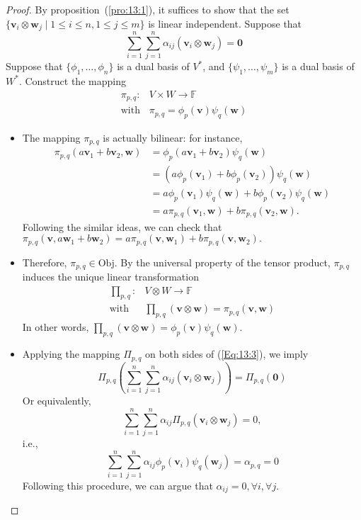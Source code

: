 \begin{proof}
By proposition~(\ref{pro:13:1}), 
it suffices to show that the set $\{\bm v_i\otimes\bm w_j\mid 1\le i\le n, 1\le j\le m\}$ is linear independent.
Suppose that
\begin{equation}\label{Eq:13:3}
\sum_{i=1}^n\sum_{j=1}^n\alpha_{ij}(\bm v_i\otimes\bm w_j)=\bm0
\end{equation}
Suppose that $\{\phi_1,\dots,\phi_n\}$ is a dual basis of $V^*$, and $\{\psi_1,\dots,\psi_m\}$ is a dual basis of $W^*$.
Construct the mapping
\[
\begin{array}{ll}
\pi_{p,q}:&V\times W\to\mathbb{F}\\
\text{with}&\pi_{p,q} = \phi_p(\bm v)\psi_q(\bm w)
\end{array}
\]
\begin{itemize}
\item
The mapping $\pi_{p,q}$ is actually bilinear: for instance,
\begin{align*}
\pi_{p,q}(a\bm v_1+b\bm v_2,\bm w)
&=
\phi_p(a\bm v_1+b\bm v_2)\psi_q(\bm w)\\
&=(a\phi_p(\bm v_1)+b\phi_p(\bm v_2))\psi_q(\bm w)\\
&=a\phi_p(\bm v_1)\psi_q(\bm w)+b\phi_p(\bm v_2)\psi_q(\bm w)\\
&=a\pi_{p,q}(\bm v_1,\bm w)+b\pi_{p,q}(\bm v_2,\bm w).
\end{align*}
Following the similar ideas, we can check that $\pi_{p,q}(\bm v,a\bm w_1+b\bm w_2)=a\pi_{p,q}(\bm v,\bm w_1)+b\pi_{p,q}(\bm v,\bm w_2).$
\item
Therefore, $\pi_{p,q}\in\text{Obj}$. By the universal property of the tensor product, $\pi_{p,q}$ induces the unique linear transformation
\[
\begin{array}{ll}
\prod_{p,q}:&V\otimes W\to \mathbb{F}\\
\text{with}&\prod_{p,q}(\bm v\otimes\bm w) = \pi_{p,q}(\bm v,\bm w)
\end{array}
\]
In other words, $\prod_{p,q}(\bm v\otimes\bm w) = \phi_p(\bm v)\psi_q(\bm w)$.
\item
Applying the mapping $\Pi_{p,q}$ on both sides of (\ref{Eq:13:3}), we imply
\[
\Pi_{p,q}
\left(
\sum_{i=1}^n\sum_{j=1}^n\alpha_{ij}(\bm v_i\otimes\bm w_j)
\right)
=
\Pi_{p,q}(\bm0)
\]
Or equivalently,
\[
\sum_{i=1}^n\sum_{j=1}^n\alpha_{ij}\Pi_{p,q}(\bm v_i\otimes\bm w_j)=0,
\]
i.e.,
\[
\sum_{i=1}^n\sum_{j=1}^n\alpha_{ij}\phi_p(\bm v_i)\psi_q(\bm w_j)=\alpha_{p,q}=0
\]
Following this procedure, we can argue that $\alpha_{ij}=0,\forall i, \forall j$.
\end{itemize}
\end{proof}

